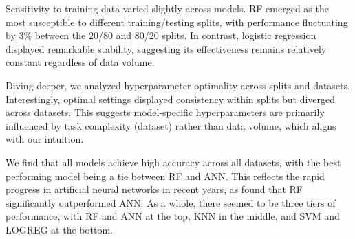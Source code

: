 \documentclass{article}
\begin{document}
Sensitivity to training data varied slightly across models. RF emerged as the
most susceptible to different training/testing splits, with performance
fluctuating by 3\% between the 20/80 and 80/20 splits. In contrast, logistic
regression displayed remarkable stability, suggesting its effectiveness remains
relatively constant regardless of data volume.

Diving deeper, we analyzed hyperparameter optimality across splits and
datasets. Interestingly, optimal settings displayed consistency within splits
but diverged across datasets. This suggests model-specific hyperparameters are
primarily influenced by task complexity (dataset) rather than data volume,
which aligns with our intuition.

We find that all models achieve high accuracy across all datasets, with the
best performing model being a tie between RF and ANN. This reflects the rapid
progress in artificial neural networks in recent years, as
\cite{empirical-comparison} found that RF significantly outperformed ANN. As a
whole, there seemed to be three tiers of performance, with RF and ANN at the
top, KNN in the middle, and SVM and LOGREG at the bottom.


\end{document}
